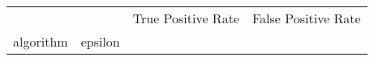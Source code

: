 \begin{tabular}{llrr}
\toprule
 &  & True Positive Rate & False Positive Rate \\
algorithm & epsilon &  &  \\
\midrule
\bottomrule
\end{tabular}
